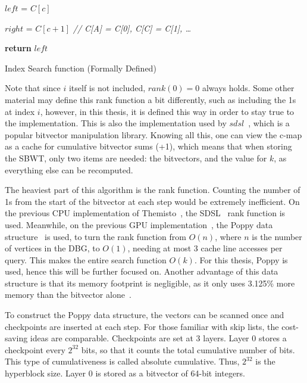 \begin{algorithm}
  $\mathit{left}$ = $C[c]$

  $right$ = $C[c+1]$  \textit{// C[A] = C[0], C[C] = C[1], \ldots}

  \textbf{return} $\mathit{left}$
  \caption{Index Search function (Formally Defined)}\label{alg:IndexSearchFormalPseudoCode}
\end{algorithm}

Note that since $i$ itself is not included, $\mathit{rank}(0) = 0$ always holds.
Some other material may define this rank function a bit differently, such as including the 1s at index $i$, however, in this thesis, it is defined this way in order to stay true to the implementation.
This is also the implementation used by $sdsl$~\cite{SDSL}, which is a popular bitvector manipulation library.
Knowing all this, one can view the c-map as a cache for cumulative bitvector sums (+1), which means that when storing the SBWT, only two items are needed: the bitvectors, and the value for $k$, as everything else can be recomputed.

The heaviest part of this algorithm is the rank function.
Counting the number of 1s from the start of the bitvector at each step would be extremely inefficient.
On the previous CPU implementation of Themisto~\cite{Themisto}, the SDSL~\cite{SDSL} rank function is used.
Meanwhile, on the previous GPU implementation~\cite{Harri}, the Poppy data structure~\cite{Poppy} is used, to turn the rank function from $O(n)$, where $n$ is the number of vertices in the DBG, to $O(1)$, needing at most 3 cache line accesses per query.
This makes the entire search function $O(k)$.
For this thesis, Poppy is used, hence this will be further focused on.
Another advantage of this data structure is that its memory footprint is negligible, as it only uses 3.125\% more memory than the bitvector alone~\cite{Poppy}.

To construct the Poppy data structure, the vectors can be scanned once and checkpoints are inserted at each step.
For those familiar with skip lists, the cost-saving ideas are comparable.
Checkpoints are set at 3 layers.
Layer 0 stores a checkpoint every $2^{32}$ bits, so that it counts the total cumulative number of bits.
This type of cumulativeness is called absolute cumulative.
Thus, $2^{32}$ is the hyperblock size.
Layer 0 is stored as a bitvector of 64-bit integers.

